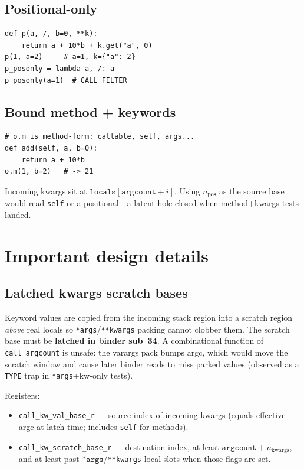 \documentclass[11pt,a4paper]{article}
\begin{document}
\subsection{Positional-only}
\begin{lstlisting}
def p(a, /, b=0, **k):
    return a + 10*b + k.get("a", 0)
p(1, a=2)     # a=1, k={"a": 2}
p_posonly = lambda a, /: a
p_posonly(a=1)  # CALL_FILTER
\end{lstlisting}

\subsection{Bound method + keywords}
\begin{lstlisting}
# o.m is method-form: callable, self, args...
def add(self, a, b=0):
    return a + 10*b
o.m(1, b=2)   # -> 21
\end{lstlisting}
Incoming kwargs sit at $\texttt{locals}[\texttt{argcount}+i]$.
Using $n_{\mathrm{pos}}$ as the source base would read \texttt{self} or a
positional---a latent hole closed when method+kwargs tests landed.

\section{Important design details}

\subsection{Latched kwargs scratch bases}
Keyword values are copied from the incoming stack region into a scratch region
\emph{above} real locals so \texttt{*args}/\texttt{**kwargs} packing cannot
clobber them.
The scratch base must be \textbf{latched in binder sub~34}.
A combinational function of \texttt{call\_argcount} is unsafe: the varargs pack
bumps argc, which would move the scratch window and cause later binder reads to
miss parked values (observed as a \texttt{TYPE} trap in
\texttt{*args}+kw-only tests).

Registers:
\begin{itemize}[leftmargin=*]
  \item \texttt{call\_kw\_val\_base\_r} --- source index of incoming kwargs
    (equals effective argc at latch time; includes \texttt{self} for methods).
  \item \texttt{call\_kw\_scratch\_base\_r} --- destination index, at least
    $\texttt{argcount}+n_{\mathrm{kwargs}}$, and at least past
    $\texttt{*args}$/\texttt{**kwargs} local slots when those flags are set.
\end{itemize}
\end{document}
